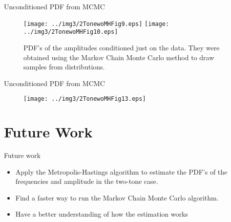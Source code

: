 ﻿\documentclass[mathserif]{beamer}
\begin{document}
	\begin{frame}{Unconditioned PDF from MCMC}
		\begin{figure}
			\centering
			\texttt{[image: ../img3/2TonewoMHFig9.eps]}
			\texttt{[image: ../img3/2TonewoMHFig10.eps]}
			\caption{PDF's of the amplitudes conditioned just on the data. They were obtained using the Markov Chain Monte Carlo method to draw samples from distributions.}
		\end{figure}
	\end{frame}
	
	\begin{frame}{Unconditioned PDF from MCMC}
		\begin{figure}
			\centering
			\texttt{[image: ../img3/2TonewoMHFig13.eps]}
		\end{figure}
	\end{frame}
	\section{Future Work}
	
	\begin{frame}{Future work}
		\begin{itemize}
			\item Apply the Metropolis-Hastings algorithm to estimate the PDF's of the frequencies and amplitude in the two-tone case.
			
			\item Find a faster way to run the Markov Chain Monte Carlo algorithm.
			
			\item Have a better understanding of how the estimation works
			
		\end{itemize}
	\end{frame}
	

	
\end{document}
